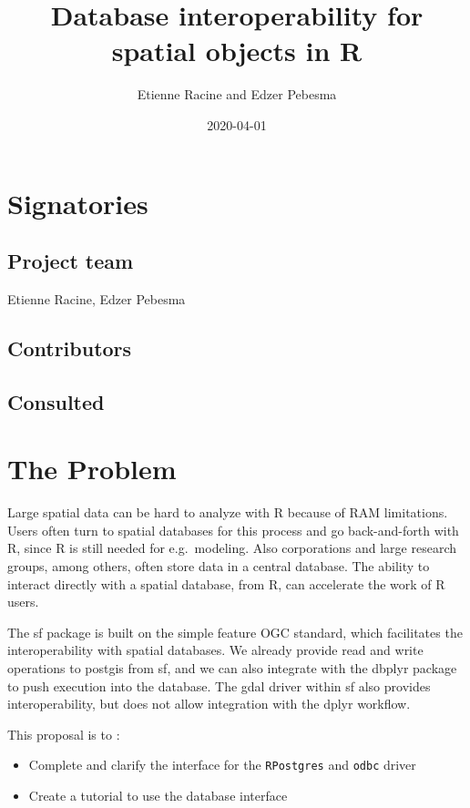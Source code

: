 \documentclass[]{article}
\title{Database interoperability for spatial objects in R}
\author{Etienne Racine and Edzer Pebesma}
\date{2020-04-01}
\providecommand{\tightlist}{%
  \setlength{\itemsep}{0pt}\setlength{\parskip}{0pt}}
\begin{document}
\maketitle

\hypertarget{signatories}{%
\section{Signatories}\label{signatories}}

\hypertarget{project-team}{%
\subsection{Project team}\label{project-team}}

Etienne Racine, Edzer Pebesma

\hypertarget{contributors}{%
\subsection{Contributors}\label{contributors}}

\hypertarget{consulted}{%
\subsection{Consulted}\label{consulted}}

\hypertarget{the-problem}{%
\section{The Problem}\label{the-problem}}

Large spatial data can be hard to analyze with R because of RAM
limitations. Users often turn to spatial databases for this process and
go back-and-forth with R, since R is still needed for e.g.~modeling.
Also corporations and large research groups, among others, often store
data in a central database. The ability to interact directly with a
spatial database, from R, can accelerate the work of R users.

The sf package is built on the simple feature OGC standard, which
facilitates the interoperability with spatial databases. We already
provide read and write operations to postgis from sf, and we can also
integrate with the dbplyr package to push execution into the database.
The gdal driver within sf also provides interoperability, but does not
allow integration with the dplyr workflow.

This proposal is to :

\begin{itemize}
\tightlist
\item
  Complete and clarify the interface for the \texttt{RPostgres} and
  \texttt{odbc} driver
\item
  Create a tutorial to use the database interface
\end{itemize}
\end{document}

